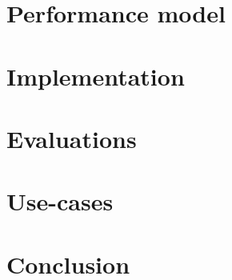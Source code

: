 \documentclass[5p]{elsarticle}
\begin{document}
\section{\mad}
\label{sec:forma_model}


\section{Performance model}
\label{sec:perf_model}


\section{Implementation}
\label{sec:implem}

\section{Evaluations}
\label{sec:evaluations}


\section{Use-cases}
\label{sec:use-cases}


\section{Conclusion}
\label{sec:conc}






%  

\end{document}
